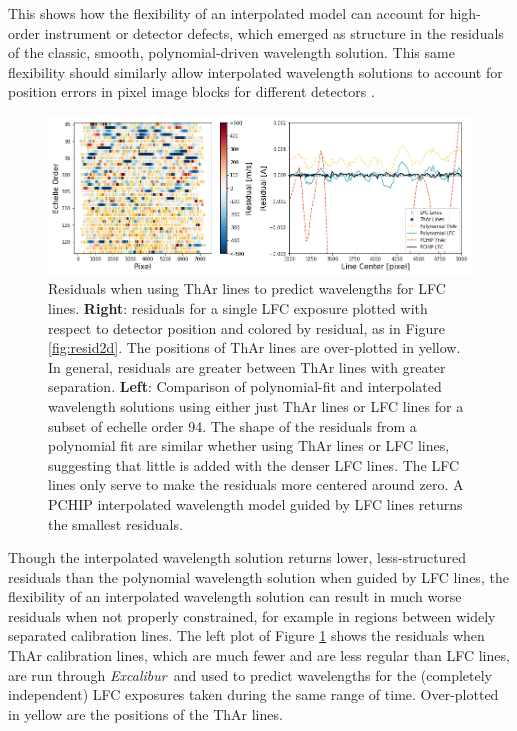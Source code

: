 \documentclass[modern]{aastex63}
\newcommand{\project}[1]{\textsl{#1}}
\newcommand{\name}{\project{Excalibur}}
\begin{document}
This shows how the flexibility of an interpolated model can account for high-order instrument or detector defects, which emerged as structure in the residuals of the classic, smooth, polynomial-driven wavelength solution.  This same flexibility should similarly allow interpolated wavelength solutions to account for position errors in pixel image blocks for different detectors \citep{fischer2016, milakovic2020}.

\begin{figure}[t]
\centering
\includegraphics[width=\textwidth]{Figures/lineDensity.png}
\caption{Residuals when using ThAr lines to predict wavelengths for LFC lines.  \textbf{Right}: residuals for a single LFC exposure plotted with respect to detector position and colored by residual, as in Figure \ref{fig:resid2d}.  The positions of ThAr lines are over-plotted in yellow.  In general, residuals are greater between ThAr lines with greater separation.
\textbf{Left}: Comparison of polynomial-fit and interpolated wavelength solutions using either just ThAr lines or LFC lines for a subset of echelle order 94.  The shape of the residuals from a polynomial fit are similar whether using ThAr lines or LFC lines, suggesting that little is added with the denser LFC lines.  The LFC lines only serve to make the residuals more centered around zero.  A PCHIP interpolated wavelength model guided by LFC lines returns the smallest residuals.}
\label{fig:waveResids}
\end{figure} 

Though the interpolated wavelength solution returns lower, less-structured residuals than the polynomial wavelength solution when guided by LFC lines, the flexibility of an interpolated wavelength solution can result in much worse residuals when not properly constrained, for example in regions between widely separated calibration lines.  The left plot of Figure \ref{fig:waveResids} shows the residuals when ThAr calibration lines, which are much fewer and are less regular than LFC lines, are run through \name\ and used to predict wavelengths for the (completely independent) LFC exposures taken during the same range of time.  Over-plotted in yellow are the positions of the ThAr lines. 
\end{document}
